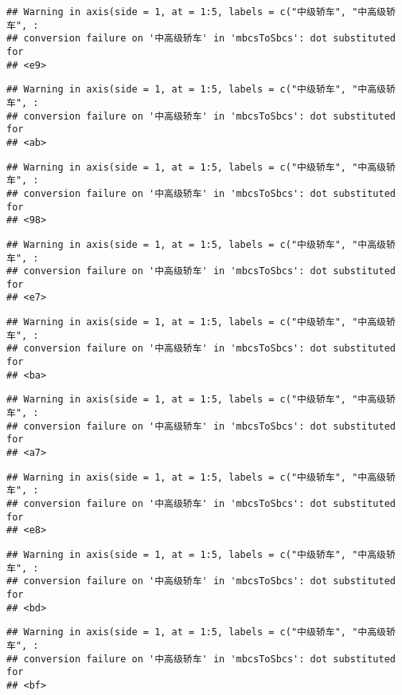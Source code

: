 \documentclass[]{article}
\begin{document}
\begin{verbatim}
## Warning in axis(side = 1, at = 1:5, labels = c("中级轿车", "中高级轿车", :
## conversion failure on '中高级轿车' in 'mbcsToSbcs': dot substituted for
## <e9>
\end{verbatim}

\begin{verbatim}
## Warning in axis(side = 1, at = 1:5, labels = c("中级轿车", "中高级轿车", :
## conversion failure on '中高级轿车' in 'mbcsToSbcs': dot substituted for
## <ab>
\end{verbatim}

\begin{verbatim}
## Warning in axis(side = 1, at = 1:5, labels = c("中级轿车", "中高级轿车", :
## conversion failure on '中高级轿车' in 'mbcsToSbcs': dot substituted for
## <98>
\end{verbatim}

\begin{verbatim}
## Warning in axis(side = 1, at = 1:5, labels = c("中级轿车", "中高级轿车", :
## conversion failure on '中高级轿车' in 'mbcsToSbcs': dot substituted for
## <e7>
\end{verbatim}

\begin{verbatim}
## Warning in axis(side = 1, at = 1:5, labels = c("中级轿车", "中高级轿车", :
## conversion failure on '中高级轿车' in 'mbcsToSbcs': dot substituted for
## <ba>
\end{verbatim}

\begin{verbatim}
## Warning in axis(side = 1, at = 1:5, labels = c("中级轿车", "中高级轿车", :
## conversion failure on '中高级轿车' in 'mbcsToSbcs': dot substituted for
## <a7>
\end{verbatim}

\begin{verbatim}
## Warning in axis(side = 1, at = 1:5, labels = c("中级轿车", "中高级轿车", :
## conversion failure on '中高级轿车' in 'mbcsToSbcs': dot substituted for
## <e8>
\end{verbatim}

\begin{verbatim}
## Warning in axis(side = 1, at = 1:5, labels = c("中级轿车", "中高级轿车", :
## conversion failure on '中高级轿车' in 'mbcsToSbcs': dot substituted for
## <bd>
\end{verbatim}

\begin{verbatim}
## Warning in axis(side = 1, at = 1:5, labels = c("中级轿车", "中高级轿车", :
## conversion failure on '中高级轿车' in 'mbcsToSbcs': dot substituted for
## <bf>
\end{verbatim}
\end{document}
